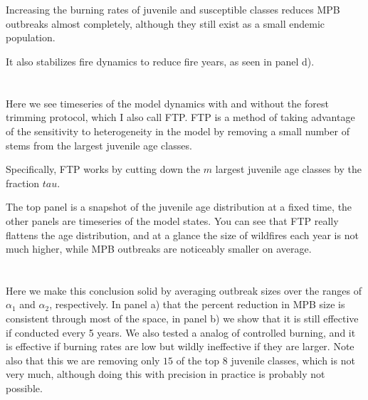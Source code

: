 \documentclass{article}
\begin{document}
\section{}

Increasing the burning rates of juvenile and susceptible classes reduces MPB outbreaks almost completely, although they still exist as a small endemic population.

It also stabilizes fire dynamics to reduce fire years, as seen in panel d).

\section{}


Here we see timeseries of the model dynamics with and without the forest trimming protocol, which I also call FTP. FTP is a method of taking advantage of the sensitivity to heterogeneity in the model by removing a small number of stems from the largest juvenile age classes.    

Specifically, FTP works by cutting down the $m$ largest juvenile age classes by the fraction $tau$.

The top panel is a snapshot of the juvenile age distribution at a fixed time, the other panels are timeseries of the model states. You can see that FTP really flattens the age distribution, and at a glance the size of wildfires each year is not much higher, while MPB outbreaks are noticeably smaller on average.  


\section{}

Here we make this conclusion solid by averaging outbreak sizes over the ranges of $\alpha_1$ and $\alpha_2$, respectively. In panel a) that the percent reduction in MPB size is consistent through most of the space, in panel b) we show that it is still effective if conducted every 5 years. We also tested a analog of controlled burning, and it is effective if burning rates are low but wildly ineffective if they are larger. Note also that this we are removing only $15$ of the top 8 juvenile classes, which is not very much, although doing this with precision in practice is probably not possible. 

\section{}
\end{document}
